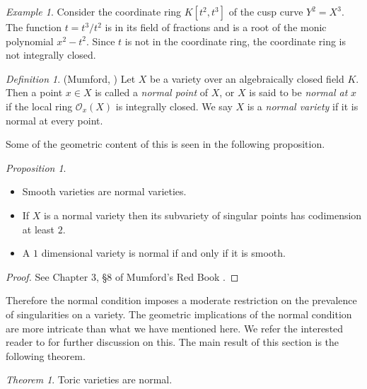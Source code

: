 \documentclass[BSc]{usydthesis}
\numberwithin{equation}{chapter}
\theoremstyle{remark}
\newtheorem{Definition}[equation]{Definition}
\newtheorem{Theorem}[equation]{Theorem}
\newtheorem{Proposition}[equation]{Proposition}
\newtheorem{Example}[equation]{Example}
\begin{document}
\begin{Example}\label{Cusp}
 Consider the coordinate ring $K[t^2,t^3]$ of the cusp curve $Y^2=X^3.$ The function $t = t^3/t^2$ is in its field of fractions and is a root of the monic polynomial $x^2-t^2.$ Since $t$ is not in the coordinate ring, the coordinate ring is not integrally closed.
\end{Example}


\begin{Definition}(Mumford, \cite[Page.~ 196, Chapter 3, \S 8]{MumfordRedBook}) Let $X$ be a variety over an algebraically closed field $K.$ Then a point $x\in X$ is called a {\em normal point} of $X$, or $X$ is said to be {\em normal at} $x$ if the local ring $\mathcal{O}_x(X)$ is integrally closed. We say $X$ is a {\em normal variety} if it is normal at every point. 
\end{Definition}

Some of the geometric content of this is seen in the following proposition. 

\begin{Proposition}
~
\begin{itemize}
  \item Smooth varieties are normal varieties. 
  \item If $X$ is a normal variety then its subvariety of singular points has codimension at least $2.$
  \item A $1$ dimensional variety is normal if and only if it is smooth.
 \end{itemize}

\end{Proposition}
\begin{proof}
 See Chapter 3, \S 8 of Mumford's Red Book \cite{MumfordRedBook}.
\end{proof}

Therefore the normal condition imposes a  moderate restriction on the prevalence of singularities on a variety. The geometric implications of the normal condition are more intricate than what we have mentioned here. We refer the interested reader to \cite{MO} for further discussion on this. The main result of this section is the following theorem.


\begin{Theorem} 
Toric varieties are normal.
\end{Theorem}
\end{document}
